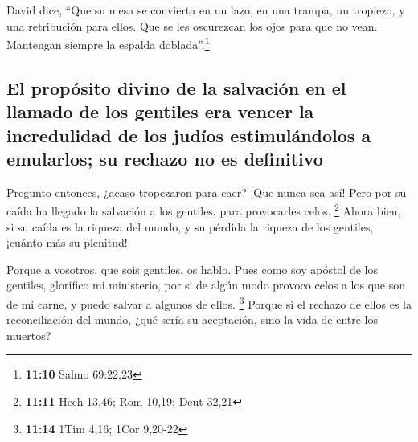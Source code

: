 \begin{paracol}{2}
 David dice, ``Que su mesa se convierta en un lazo, en una
trampa, un tropiezo, y una retribución para ellos.  Que
se les oscurezcan los ojos para que no vean. Mantengan siempre la
espalda doblada''.\footnote{\textbf{11:10} Salmo 69:22,23}

\hypertarget{el-propuxf3sito-divino-de-la-salvaciuxf3n-en-el-llamado-de-los-gentiles-era-vencer-la-incredulidad-de-los-juduxedos-estimuluxe1ndolos-a-emularlos-su-rechazo-no-es-definitivo}{%
\subsection{El propósito divino de la salvación en el llamado de los
gentiles era vencer la incredulidad de los judíos estimulándolos a
emularlos; su rechazo no es
definitivo}\label{el-propuxf3sito-divino-de-la-salvaciuxf3n-en-el-llamado-de-los-gentiles-era-vencer-la-incredulidad-de-los-juduxedos-estimuluxe1ndolos-a-emularlos-su-rechazo-no-es-definitivo}}

 Pregunto entonces, ¿acaso tropezaron para caer? ¡Que
nunca sea así! Pero por su caída ha llegado la salvación a los gentiles,
para provocarles celos. \footnote{\textbf{11:11} Hech 13,46; Rom 10,19;
  Deut 32,21}  Ahora bien, si su caída es la riqueza del
mundo, y su pérdida la riqueza de los gentiles, ¡cuánto más su plenitud!

 Porque a vosotros, que sois gentiles, os hablo. Pues
como soy apóstol de los gentiles, glorifico mi ministerio,
 por si de algún modo provoco celos a los que son de mi
carne, y puedo salvar a algunos de ellos. \footnote{\textbf{11:14} 1Tim
  4,16; 1Cor 9,20-22}  Porque si el rechazo de ellos es
la reconciliación del mundo, ¿qué sería su aceptación, sino la vida de
entre los muertos?


\end{paracol}
